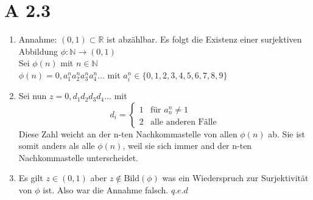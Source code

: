 \documentclass{article}
\begin{document}
        \section*{A 2.3}
        \begin{enumerate}
            \item Annahme: \((0, 1) \subset \mathbb{R}\) ist abzählbar. Es folgt die Existenz einer surjektiven Abbildung
            \(\phi: \mathbb{N} \to (0, 1)\) \\
            Sei \(\phi(n)\) mit \(n \in \mathbb{N}\) \\
            \(\phi(n) = 0,a_1^n a_2^n a_3^n a_4^n \dots \)
            mit \(a_i^n \in \{0,1,2,3,4,5,6,7,8,9\} \)

            \item Sei nun \(z = 0,d_1 d_2 d_3 d_4 \dots \)
            mit
            \begin{equation*}
                d_i =
                \begin{cases}
                    1 & \text{für } a_n^n \neq 1 \\
                    2 & \text{alle anderen Fälle}
                \end{cases}
            \end{equation*}
            Diese Zahl weicht an der n-ten Nachkommastelle von allen \(\phi(n)\) ab.
            Sie ist somit anders als alle \(\phi(n)\), weil sie sich immer and der n-ten Nachkommastelle unterscheidet.

            \item Es gilt \(z \in (0,1 )\) aber \(z \notin \text{Bild}(\phi)\) was ein Wiederspruch zur Surjektivität von \(\phi \) ist.
            Also war die Annahme falsch. \(q.e.d\)
        \end{enumerate}
\end{document}
